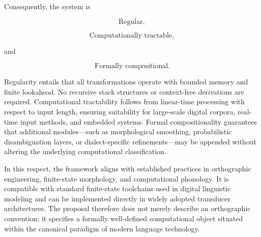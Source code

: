 \documentclass[12pt]{article}
\begin{document}
Consequently, the system is

\[
\text{Regular},
\]

\[
\text{Computationally tractable},
\]

and

\[
\text{Formally compositional}.
\]

Regularity entails that all transformations operate with bounded memory and finite lookahead. No recursive stack structures or context-free derivations are required. Computational tractability follows from linear-time processing with respect to input length, ensuring suitability for large-scale digital corpora, real-time input methods, and embedded systems. Formal compositionality guarantees that additional modules—such as morphological smoothing, probabilistic disambiguation layers, or dialect-specific refinements—may be appended without altering the underlying computational classification.

In this respect, the framework aligns with established practices in orthographic engineering, finite-state morphology, and computational phonology. It is compatible with standard finite-state toolchains used in digital linguistic modeling and can be implemented directly in widely adopted transducer architectures. The proposal therefore does not merely describe an orthographic convention; it specifies a formally well-defined computational object situated within the canonical paradigm of modern language technology.
\end{document}

